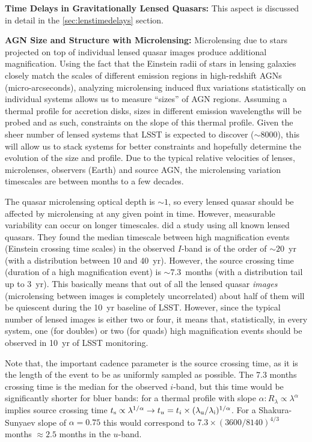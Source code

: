 {\bf Time Delays in Gravitationally Lensed Quasars:} This aspect is discussed in detail in the \autoref{sec:lenstimedelays} section.

{\bf AGN Size and Structure with Microlensing:} Microlensing due to stars projected on top of individual lensed quasar images produce additional magnification. Using the fact that the Einstein radii of stars in lensing galaxies closely match the scales of different emission regions in high-redshift AGNs (micro-arcseconds), analyzing microlensing induced flux variations statistically on individual systems allows us to measure ``sizes'' of AGN regions.
%
Assuming a thermal profile for accretion disks, sizes in different emission wavelengths will be probed and as such, constraints on the slope of this thermal profile. Given the sheer number of lensed systems that LSST is expected to discover ($\sim8000$), this will allow us to stack systems for better constraints and hopefully determine the evolution of the size and profile. Due to the typical relative velocities of lenses, microlenses, observers (Earth) and source AGN, the microlensing variation timescales are between months to a few decades.

The quasar microlensing optical depth is $\sim1$, so every lensed quasar should be affected by microlensing at any given point in time. However, measurable variability can occur on longer timescales. \citet{MosqueraandKochanek2011} did a study using all known lensed quasars. They found the median timescale between high magnification events (Einstein crossing time scales) in the observed $I$-band is of the order of $\sim20$~yr (with a distribution between 10 and 40~yr). However, the source crossing time (duration of a high magnification event) is $\sim7.3$~months (with a distribution tail up to 3~yr). This basically means that out of all the lensed quasar {\em images} (microlensing between images is completely uncorrelated) about half of them will be quiescent during the 10~yr baseline of LSST. However, since the typical number of lensed images is either two or four, it means that, statistically, in every system, one (for doubles) or two (for quads) high magnification events should be observed in 10~yr of LSST monitoring.

Note that, the important cadence parameter is the source crossing time, as it is the length of the event to be as uniformly sampled as possible. The 7.3 months crossing time is the median for the observed $i$-band, but this time would be significantly shorter for bluer bands: for a thermal profile with slope $\alpha: R_\lambda \propto \lambda^\alpha$ implies source crossing time $t_{\rm s} \propto \lambda^{1/\alpha} \rightarrow t_u=t_i \times (\lambda_{\rm u} / \lambda_{\rm i})^{1/\alpha}$. For a Shakura-Sunyaev slope of $\alpha=0.75$ this would correspond to $7.3 \times (3600/8140)^{4/3}$ months $\approx 2.5$ months in the $u$-band.

